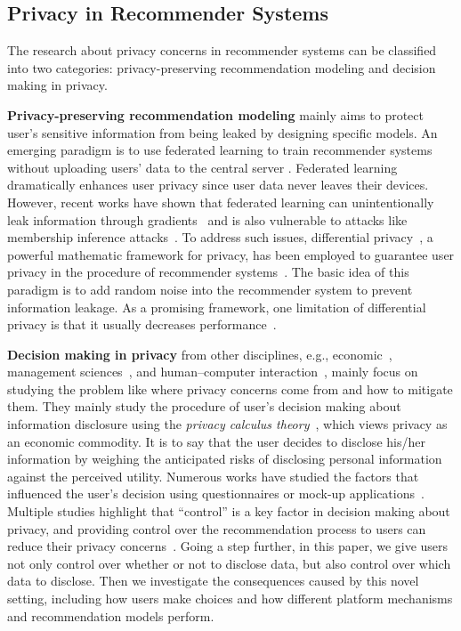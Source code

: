 \subsection{Privacy in Recommender Systems}
The research about privacy concerns in recommender systems can be classified into two categories: privacy-preserving recommendation modeling and decision making in privacy.

\textbf{Privacy-preserving recommendation modeling} mainly aims to protect user's sensitive information from being leaked by designing specific models.
An emerging paradigm is to use federated learning to train recommender systems without uploading users' data to the central server
\cite{Qi:emnlp20:Privacy,Muhammad:kdd20:FedFast,Lin:sigir20:Meta,wang:vldbj2021:fast}.
Federated learning dramatically enhances user privacy since user data never leaves their devices.
However, recent works have shown that federated learning can unintentionally leak information through gradients~\cite{Zhu:nips19:Deep,li2019privacy} and is also vulnerable to attacks like membership inference attacks~\cite{melis2019exploiting,nasr2019comprehensive}.
To address such issues, differential privacy~\cite{Dwork:Algorithmic}, a powerful mathematic framework for privacy, has been employed to guarantee user privacy in the procedure of recommender systems~\cite{McSherry:kdd09:Differentially,Berlioz:recsys15:Applying,shin2018privacy,Gao:sigir20:DPLCF}.
The basic idea of this paradigm is to add random noise into the recommender system to prevent information leakage.
As a promising framework, one limitation of differential privacy is that it usually decreases performance~\cite{Domingo:cacm21:Limits}.

\textbf{Decision making in privacy} from other disciplines, e.g., economic~\cite{lin2019valuing}, management sciences~\cite{Culnan:os99:Information}, and human–computer interaction~\cite{Knijnenburg:recsys12:Inspectability,Knijnenburg:tiis13:Making}, mainly focus on studying the problem like where privacy concerns come from and how to mitigate them.
They mainly study the procedure of user's decision making about information disclosure using the \textit{privacy calculus theory}~\cite{Laufer:si77:Privacy,Culnan:os99:Information}, which views privacy as an economic commodity.
It is to say that the user decides to disclose his/her information by weighing the anticipated risks of disclosing personal information against the perceived utility.
Numerous works have studied the factors that influenced the user's decision using questionnaires or mock-up applications~\cite{Knijnenburg:recsys12:Inspectability,Knijnenburg:tiis13:Making,Chen:CHI18:This,Zhang:hcs19:Proactive}.
Multiple studies highlight that ``control'' is a key factor in decision making about privacy, and providing control over the recommendation process to users can reduce their privacy concerns~\cite{Zhang2014-oa,Chen:CHI18:This}.
Going a step further, in this paper, we give users not only control over whether or not to disclose data, but also control over which data to disclose.
Then we investigate the consequences caused by this novel setting, including how users make choices and how different platform mechanisms and recommendation models perform.


